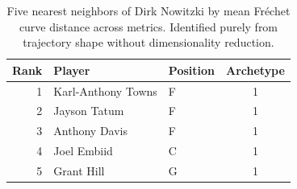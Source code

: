 \begin{table}[htbp]
  \centering\small
  \begin{tabular}{rllc}
    \toprule
    Rank & Player & Position & Archetype \\
    \midrule
    1 & Karl-Anthony Towns & F & 1 \\
    2 & Jayson Tatum & F & 1 \\
    3 & Anthony Davis & F & 1 \\
    4 & Joel Embiid & C & 1 \\
    5 & Grant Hill & G & 1 \\
    \bottomrule
  \end{tabular}
  \caption{Five nearest neighbors of Dirk Nowitzki by mean Fr\'{e}chet curve distance across metrics. Identified purely from trajectory shape without dimensionality reduction.}
  \label{tab:Dirk_Nowitzki_frechet_curve_neighbors}
\end{table}

